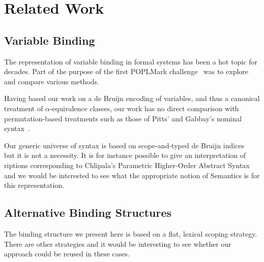 {\begin{center}
\end{center}





\section{Related Work}\label{section:related-work}

\subsection{Variable Binding} The representation of variable binding
in formal systems has been a hot topic for decades. Part of the purpose
of the first POPLMark challenge~\citeyear{poplmark} was to explore and
compare various methods.

Having based our work on a de Bruijn encoding of variables, and thus a
canonical treatment of \(\alpha\)-equivalence classes, our work has no
direct comparison with permutation-based treatments such as those of
Pitts' and Gabbay's nominal syntax~\cite{gabbay:newaas-jv}.

Our generic universe of syntax is based on
scope-and-typed de Bruijn indices~\cite{de1972lambda} but it is not
a necessity. It is for instance possible to give an interpretation
of riptions corresponding to Chlipala's Parametric Higher-Order
Abstract Syntax~\citeyear{chlipala2008parametric} and we would be interested
to see what the appropriate notion of Semantics is for this representation.

\subsection{Alternative Binding Structures} The binding structure we
present here is based on a flat, lexical scoping strategy. There are
other strategies and it would be interesting to see whether
our approach could be reused in these cases.

}
